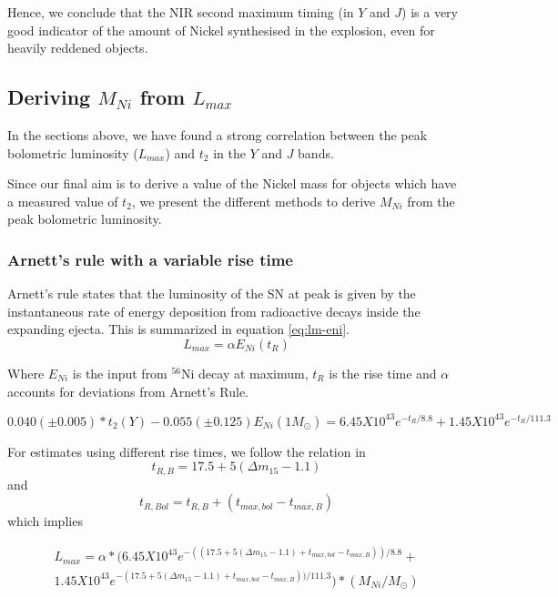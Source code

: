 Hence, we conclude that the NIR second maximum timing (in $Y$ and $J$) is a very good indicator of the amount of Nickel synthesised in the explosion, even for heavily reddened objects. 


\subsection{Deriving $M_{Ni}$ from $L_{max}$}
In the sections above, we have found a strong correlation between the peak bolometric luminosity ($L_{max}$) and $t_2$ in the $Y$ and $J$ bands. 

Since our final aim is to derive a value of the Nickel mass for objects which have a measured value of $t_2$, we present the different methods to derive $M_{Ni}$ from the peak bolometric luminosity.

\subsubsection{Arnett's rule with a variable rise time}
Arnett's rule states that the luminosity of the SN at peak is given by the instantaneous rate of energy deposition from radioactive decays inside the expanding ejecta. 
This is summarized in equation \eqref{eq:lm-eni}. 
\begin{equation}
L_{max}=\alpha E_{Ni} (t_R)
\end{equation}

Where $E_{Ni}$ is the input from $^{56}$Ni decay at maximum, $t_R$ is the rise time and $\alpha$ accounts for deviations from Arnett's Rule.

\begin{equation}
\label{eq:eni}0.040(\pm 0.005) * t_2(Y) - 0.055 (\pm 0.125)
E_{Ni} (1 M_{\odot})= 6.45  X  10^{43} e^{-t_R/8.8} + 1.45  X  10^{43} e^{-t_R/111.3}
\end{equation}

For estimates using different rise times, we follow the relation in \citet{G2011}
\begin{equation}
t_{R, B}=17.5 + 5(\Delta m_{15} - 1.1)
\end{equation}
and  
\begin{equation}
t_{R, Bol}=t_{R, B}+ (t_{max, bol} -t_{max, B})
\end{equation}
which implies 

\begin{multline}
L_{max}=\alpha * (6.45  X  10^{43} e^{-((17.5 + 5(\Delta m_{15} - 1.1)
+t_{max, bol} -t_{max, B}))/8.8} + \\ 1.45  X  10^{43} e^{-(17.5 + 5(\Delta m_{15} - 1.1)+t_{max, bol} -t_{max, B}))/111.3})*(M_{Ni}/M_{\odot})
\end{multline}


